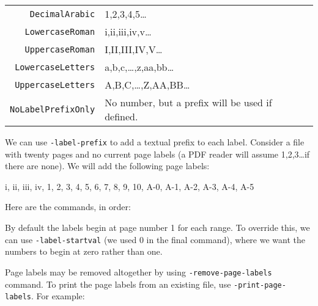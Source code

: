 \documentclass{book}
\begin{document}
\vspace{4mm}
{\small\begin{tabular}{rl}
  \texttt{DecimalArabic} & 1,2,3,4,5\ldots \\
  \texttt{LowercaseRoman} & i,ii,iii,iv,v\ldots \\
  \texttt{UppercaseRoman} & I,II,III,IV,V\ldots \\
  \texttt{LowercaseLetters} & a,b,c,\ldots,z,aa,bb\ldots \\
  \texttt{UppercaseLetters} & A,B,C,\ldots,Z,AA,BB\ldots \\
  \texttt{NoLabelPrefixOnly} & No number, but a prefix will be used if defined.
\end{tabular}}
\vspace{4mm}

\noindent We can use \texttt{-label-prefix} to add a textual prefix to each label. 
Consider a file with twenty pages and no current page labels (a PDF reader will assume 1,2,3\ldots if there are none). We will add the following page labels:

\vspace{4mm}
i, ii, iii, iv, 1, 2, 3, 4, 5, 6, 7, 8, 9, 10, A-0, A-1, A-2, A-3, A-4, A-5
\vspace{4mm}

\noindent Here are the commands, in order:


\noindent{}

\noindent By default the labels begin at page number 1 for each range. To override this, we can use \texttt{-label-startval} (we used $0$ in the final command), where we want the numbers to begin at zero rather than one.



Page labels may be removed altogether by using \texttt{-remove-page-labels} command. To print the page labels from an existing file, use \texttt{-print-page-labels}. For example:

\noindent{}
\end{document}
